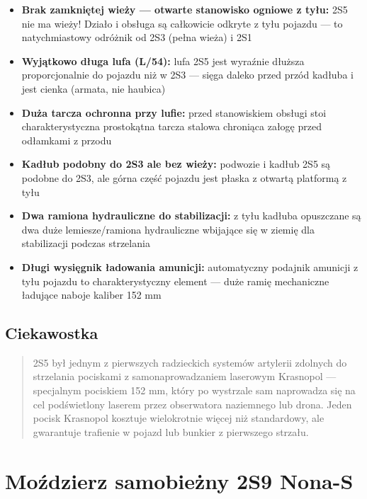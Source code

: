 \documentclass[12pt,openany,oneside]{book}
\providecommand{\tightlist}{%
  \setlength{\itemsep}{0pt}\setlength{\parskip}{0pt}}
\begin{document}
\begin{itemize}
\tightlist
\item
  \textbf{Brak zamkniętej wieży --- otwarte stanowisko ogniowe z tyłu:}
  2S5 nie ma wieży! Działo i obsługa są całkowicie odkryte z tyłu
  pojazdu --- to natychmiastowy odróżnik od 2S3 (pełna wieża) i 2S1
\item
  \textbf{Wyjątkowo długa lufa (L/54):} lufa 2S5 jest wyraźnie dłuższa
  proporcjonalnie do pojazdu niż w 2S3 --- sięga daleko przed przód
  kadłuba i jest cienka (armata, nie haubica)
\item
  \textbf{Duża tarcza ochronna przy lufie:} przed stanowiskiem obsługi
  stoi charakterystyczna prostokątna tarcza stalowa chroniąca załogę
  przed odłamkami z przodu
\item
  \textbf{Kadłub podobny do 2S3 ale bez wieży:} podwozie i kadłub 2S5 są
  podobne do 2S3, ale górna część pojazdu jest płaska z otwartą
  platformą z tyłu
\item
  \textbf{Dwa ramiona hydrauliczne do stabilizacji:} z tyłu kadłuba
  opuszczane są dwa duże lemiesze/ramiona hydrauliczne wbijające się w
  ziemię dla stabilizacji podczas strzelania
\item
  \textbf{Długi wysięgnik ładowania amunicji:} automatyczny podajnik
  amunicji z tyłu pojazdu to charakterystyczny element --- duże ramię
  mechaniczne ładujące naboje kaliber 152 mm
\end{itemize}

\section{Ciekawostka}\label{ciekawostka-11}

\begin{quote}
2S5 był jednym z pierwszych radzieckich systemów artylerii zdolnych do
strzelania pociskami z samonaprowadzaniem laserowym Krasnopol ---
specjalnym pociskiem 152 mm, który po wystrzale sam naprowadza się na
cel podświetlony laserem przez obserwatora naziemnego lub drona. Jeden
pocisk Krasnopol kosztuje wielokrotnie więcej niż standardowy, ale
gwarantuje trafienie w pojazd lub bunkier z pierwszego strzału.
\end{quote}

\chapter{Moździerz samobieżny 2S9
Nona-S}\label{moux17adzierz-samobieux17cny-2s9-nona-s}
\end{document}
